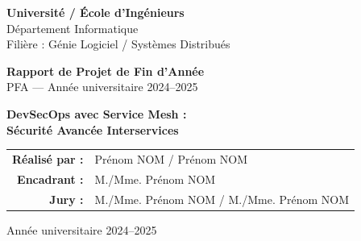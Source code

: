 \begin{titlepage}
  \centering
  \vspace*{0.5cm}


  {\Large\bfseries Université / École d'Ingénieurs}\\[0.2cm]
  {\large Département Informatique}\\[0.1cm]
  {\normalsize Filière : Génie Logiciel / Systèmes Distribués}

  \vfill

  \begin{tcolorbox}[
    colback=black, colframe=black,
    arc=6pt, boxrule=0pt,
    halign=center, valign=center
  ]
    {\huge\bfseries\color{white} Rapport de Projet de Fin d'Année}\\[8pt]
    {\large\color{white!85!gray} PFA --- Année universitaire 2024--2025}
  \end{tcolorbox}

  \vspace{1.2cm}

  {\LARGE\bfseries
    DevSecOps avec Service Mesh :\\[6pt]
    Sécurité Avancée Interservices
  }

  \vspace{1.5cm}

  \begin{tabular}{rl}
    \textbf{Réalisé par :} & Prénom NOM \quad / \quad Prénom NOM \\[4pt]
    \textbf{Encadrant :}   & M./Mme. Prénom NOM \\[4pt]
    \textbf{Jury :}        & M./Mme. Prénom NOM \quad / \quad M./Mme. Prénom NOM \\
  \end{tabular}

  \vfill
  {\normalsize Année universitaire 2024--2025}
\end{titlepage}

\newpage\thispagestyle{empty}\mbox{}\newpage
